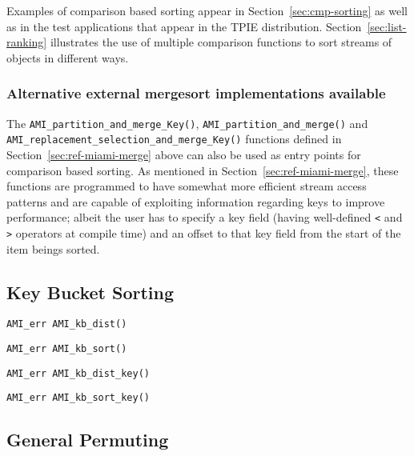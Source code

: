 Examples of comparison based sorting appear in
Section~\ref{sec:cmp-sorting} as well as in the test applications that 
appear in the TPIE distribution.  Section~\ref{sec:list-ranking}
illustrates the use of multiple comparison functions to sort streams
of objects in different ways.


\subsubsection{Alternative external mergesort implementations available}

The \verb|AMI_partition_and_merge_Key()|,
\verb|AMI_partition_and_merge()| and
\verb|AMI_replacement_selection_and_merge_Key()| 
functions defined in Section~\ref{sec:ref-miami-merge} above 
can also be used as entry points for comparison based 
sorting. As mentioned in Section~\ref{sec:ref-miami-merge},
these functions are programmed to have somewhat more efficient
stream access patterns and are capable of exploiting information
regarding keys to improve performance; albeit the user has 
to specify a key field (having well-defined \verb|<| and \verb|>|
operators at compile time) and an offset to that key field from
the start of the item beings sorted.


\subsection{Key Bucket Sorting}
\label{sec:ref-ami-kb-sort}


\begin{verbatim}
AMI_err AMI_kb_dist()
\end{verbatim}

\begin{verbatim}
AMI_err AMI_kb_sort()
\end{verbatim}

\begin{verbatim}
AMI_err AMI_kb_dist_key()
\end{verbatim}

\begin{verbatim}
AMI_err AMI_kb_sort_key()
\end{verbatim}

\subsection{General Permuting}
\label{sec:ref-ami-gp}

